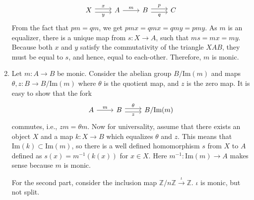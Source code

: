 \documentclass[11pt,a4paper]{article}
\begin{document}
\begin{solution}
\begin{enumerate}[label=(\alph*)]
\begin{equation*}
\begin{tikzcd}
                X \arrow[r, shift left, "x"] \arrow[r, shift right, "y"']
                & A \arrow[r, "m"] & B \arrow[r, shift left, "p"] \arrow[r, shift right, "q"'] & C
            \end{tikzcd}
            \end{equation*}
            From the fact that $pm=qm$, we get $pmx=qmx=qmy=pmy$. As $m$ is an equalizer, there is a unique map from $s:X\to A$, such that $ms=mx=my$. Because both $x$ and $y$ satisfy the commutativity of the triangle $XAB$, they must be equal to $s$, and hence, equal to each-other. Therefore, $m$ is monic.
        \item Let $m:A\to B$ be monic. Consider the abelian group $B/\text{Im}(m)$ and maps $\theta, z: B\to B/\text{Im}(m)$ where $\theta$ is the quotient map, and $z$ is the zero map. It is easy to show that the fork
            \begin{equation*}
            \begin{tikzcd}
                A \arrow[r, "m"] & B \arrow[r, shift left, "\theta"] \arrow[r, shift right, "z"'] & B/\text{Im}(m)
            \end{tikzcd}
            \end{equation*}
            commutes, i.e., $zm=\theta m$. Now for universality, assume that there exists an object $X$ and a map $k:X\to B$ which equalizes $\theta$ and $z$. This means that $\text{Im}(k)\subset\text{Im}(m)$, so there is a well defined homomorphism $s$ from $X$ to $A$ defined as $s(x)=m^{-1}(k(x))$ for $x\in X$. Here $m^{-1}:\text{Im}(m)\to A$ makes sense because $m$ is monic.\par
            For the second part, consider the inclusion map $\mathbb{Z}/n\mathbb{Z}\xrightarrow{\iota}\mathbb{Z}$. $\iota$ is monic, but not split.
    \end{enumerate}
\end{solution}
\end{document}
